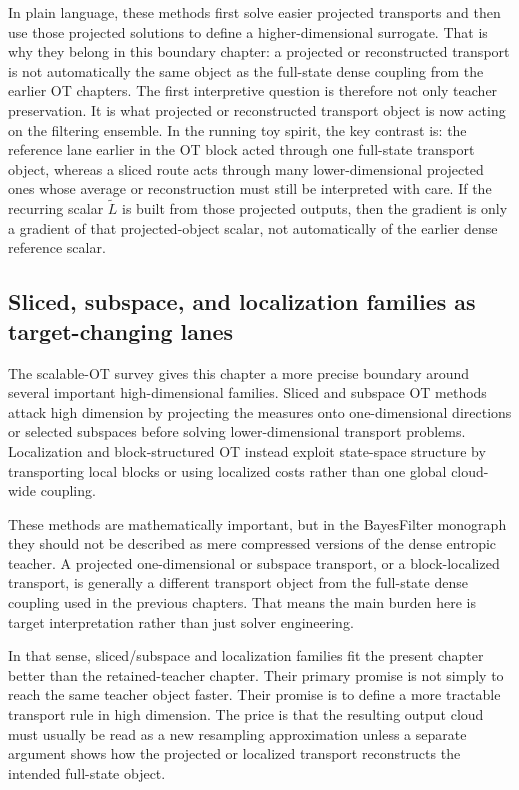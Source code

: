 In plain language, these methods first solve easier projected transports and then
use those projected solutions to define a higher-dimensional surrogate.  That is
why they belong in this boundary chapter: a projected or reconstructed transport is
not automatically the same object as the full-state dense coupling from the earlier
OT chapters.  The first interpretive question is therefore not only teacher
preservation.  It is what projected or reconstructed transport object is now acting
on the filtering ensemble.  In the running toy spirit, the key contrast is: the
reference lane earlier in the OT block acted through one full-state transport object,
whereas a sliced route acts through many lower-dimensional projected ones whose
average or reconstruction must still be interpreted with care.  If the recurring
scalar \(\widetilde L\) is built from those projected outputs, then the gradient is
only a gradient of that projected-object scalar, not automatically of the earlier
dense reference scalar.

\subsection{Sliced, subspace, and localization families as target-changing lanes}
\label{sec:bf-neural-ot-dynamic-sliced-localized-detail}

The scalable-OT survey gives this chapter a more precise boundary around several
important high-dimensional families.  Sliced and subspace OT methods attack high
dimension by projecting the measures onto one-dimensional directions or selected
subspaces before solving lower-dimensional transport problems.  Localization and
block-structured OT instead exploit state-space structure by transporting local
blocks or using localized costs rather than one global cloud-wide coupling.

These methods are mathematically important, but in the BayesFilter monograph they
should not be described as mere compressed versions of the dense entropic teacher.
A projected one-dimensional or subspace transport, or a block-localized transport,
is generally a different transport object from the full-state dense coupling used
in the previous chapters.  That means the main burden here is target
interpretation rather than just solver engineering.

In that sense, sliced/subspace and localization families fit the present chapter
better than the retained-teacher chapter.  Their primary promise is not simply to
reach the same teacher object faster.  Their promise is to define a more tractable
transport rule in high dimension.  The price is that the resulting output cloud
must usually be read as a new resampling approximation unless a separate argument
shows how the projected or localized transport reconstructs the intended
full-state object.


